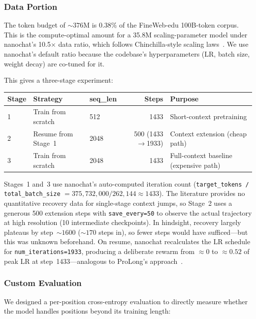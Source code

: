 \subsubsection{Data Portion}

The token budget of ${\sim}376$M is 0.38\% of the FineWeb-edu 100B-token corpus. This is the compute-optimal amount for a 35.8M scaling-parameter model under nanochat's 10.5$\times$ data ratio, which follows Chinchilla-style scaling laws~\cite{chinchilla}. We use nanochat's default ratio because the codebase's hyperparameters (LR, batch size, weight decay) are co-tuned for it.

This gives a three-stage experiment:

\begin{table}[H]
\centering\small
\begin{tabular}{@{}lllrl@{}}
\toprule
Stage & Strategy & seq\_len & Steps & Purpose \\
\midrule
1 & Train from scratch & 512 & 1433 & Short-context pretraining \\
2 & Resume from Stage~1 & 2048 & 500 (1433$\to$1933) & Context extension (cheap path) \\
3 & Train from scratch & 2048 & 1433 & Full-context baseline (expensive path) \\
\bottomrule
\end{tabular}
\end{table}

Stages~1 and~3 use nanochat's auto-computed iteration count (\texttt{target\_tokens / total\_batch\_size} $= 375{,}732{,}000 / 262{,}144 \approx 1433$). The literature provides no quantitative recovery data for single-stage context jumps, so Stage~2 uses a generous 500 extension steps with \texttt{save\_every=50} to observe the actual trajectory at high resolution (10 intermediate checkpoints). In hindsight, recovery largely plateaus by step~${\sim}1600$ (${\sim}170$ steps in), so fewer steps would have sufficed---but this was unknown beforehand. On resume, nanochat recalculates the LR schedule for \texttt{num\_iterations=1933}, producing a deliberate rewarm from ${\approx}0$ to ${\approx}0.52$ of peak LR at step~1433---analogous to ProLong's approach~\cite{prolong}.

\subsubsection{Custom Evaluation}

We designed a per-position cross-entropy evaluation to directly measure whether the model handles positions beyond its training length:

